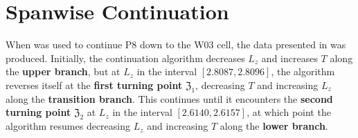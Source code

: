 \section{Spanwise Continuation}

When  was used to continue P8 down to the W03 cell, the data presented in  was produced.  Initially, the continuation algorithm decreases $L_z$ and increases $T$ along the {\bf upper branch}, but at $L_z$ in the interval $[2.8087, 2.8096]$, the algorithm reverses itself at the {\bf first turning point} $\mathfrak{Z}_1$, decreasing $T$ and increasing $L_z$ along the {\bf transition branch}. This continues until it encounters the {\bf second turning point} $\mathfrak{Z}_2$ at  $L_z$ in the interval $[2.6140,2.6157]$, at which point the algorithm resumes decreasing $L_z$ and increasing $T$ along the {\bf lower branch}.\\


